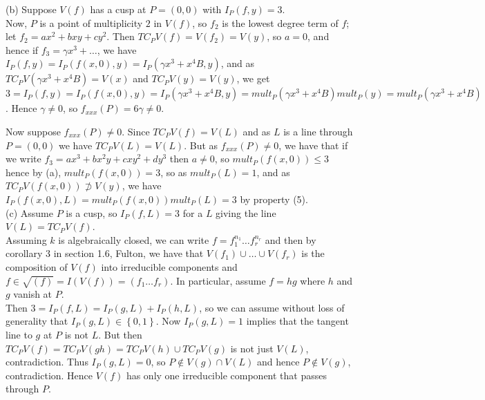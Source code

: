 \documentclass[a4paper]{article}
\begin{document}
   (b) Suppose $V(f)$ has a cusp at $P = (0,0)$ with  $I_P(f,y) = 3$.\\
   Now,  $P$ is a point of multiplicity $2$ in $V(f)$, so $f_2$ is the lowest
   degree term of $f$; let $f_2 = ax^2 + bxy + cy^2$. Then
   $TC_P V(f) = V(f_2) = V(y)$, so $a = 0$, and hence if $f_3 = \gamma x^3
   + \ldots$, we have
    $I_P (f,y) = I_P(f(x,0), y) = I_P( \gamma x^3 + x^{4} B, y)$, and as
    $TC_P V\left( \gamma x^3 + x^{4} B \right) 
    = V(x)$ and $TC_P V(y) = V(y)$, we get
    $3= I_P(f,y) =I_P(f(x,0),y) = I_P \left( \gamma x^3 + x^{4}B , y \right) = mult_P\left( 
    \gamma x^3 + x^{4} B \right) mult_P(y) = mult_P (\gamma x^3 + x^{4} B)$. Hence
    $\gamma \neq 0$, so $f_{x x x}(P) = 6 \gamma \neq 0$.\\
    \linebreak
    


  Now suppose $f_{x x x}(P) \neq 0$. Since $TC_P V(f) = V(L)$ and as $L$ is a line through $P=(0,0)$ we have
$TC_P V(L) = V(L)$. But as $f_{xxx} (P) \neq 0$, we have
that if we write $f_3 = a x^3 + b x^2 y + c x y^2 + d y^3$ then $a \neq 0$, so
$mult_P (f(x,0)) \leq 3$ hence by (a),
$mult_P(f(x,0)) = 3$, so as $mult_P (L) = 1$, and as $TC_P V(f(x,0)) \not
\supset V(y)$, we have $I_P(f(x,0), L) = mult_P (f(x,0)) mult_P(L) = 3$ by
property (5).\\
\linebreak
(c) Assume $P$ is a cusp, so
$I_P(f,L) = 3$ for a $L$ giving the line $V(L) = TC_P V(f)$.\\
Assuming $k$ is algebraically closed, we can write
$f = f_1^{n_1} \ldots f_{r}^{n_r}$ and then by corollary 3 in section 1.6,
Fulton, we have
that $V(f_1) \cup \ldots \cup  V(f_r)$ is the composition of $V(f)$ into
irreducible components and $f \in \sqrt{(f)} 
= I\left( V(f) \right) = (f_1 \ldots f_r)$.
In particular, assume $f = hg$ where $h$ and $g$ vanish at $P$.\\
Then $3 = I_P(f, L ) = I_P(g,L) + I_P(h,L)$, so we can assume without loss of
generality that $I_P(g,L) \in \left\{ 0,1 \right\} $. Now
$I_P(g,L) = 1$ implies that the tangent line to $g$ at $P$ is not $L$.
But then $TC_P V(f) = TC_P V(gh) = TC_P V(h) \cup  TC_P V(g)$ is not just
$V(L)$, contradiction.
Thus $I_P (g, L)=0$, so $P \not\in V(g) \cap V(L)$ and hence
$P \not\in V(g)$, contradiction. Hence
$V(f)$ has only one irreducible component that passes through $P$.
    

    
\end{document}
